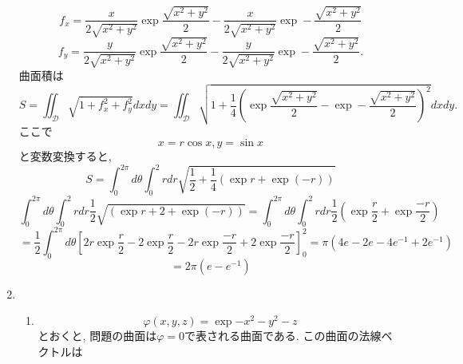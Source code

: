 \documentclass[a4paper,10pt,report]{amsart}
\theoremstyle{plain}
\theoremstyle{definition}
\theoremstyle{remark}
\begin{document}
\begin{enumerate}
\begin{equation*}
            f_{x}=\frac{x}{2\sqrt{x^{2}+y^{2}}}\exp{\frac{\sqrt{x^{2}+y^{2}}}{2}}-\frac{x}{2\sqrt{x^{2}+y^{2}}}\exp-{\frac{\sqrt{x^{2}+y^{2}}}{2}}
        \end{equation*}
        \begin{equation*}
            f_{y}=\frac{y}{2\sqrt{x^{2}+y^{2}}}\exp{\frac{\sqrt{x^{2}+y^{2}}}{2}}-\frac{y}{2\sqrt{x^{2}+y^{2}}}\exp-{\frac{\sqrt{x^{2}+y^{2}}}{2}}.
        \end{equation*}
        曲面積は
        \begin{equation*}
            S=\iint_{\mathcal{D}}\sqrt{1+f_{x}^{2}+f_{y}^{2}}dxdy=\iint_{\mathcal{D}}\sqrt{1+\frac{1}{4}{\left(\exp{\frac{\sqrt{x^{2}+y^{2}}}{2}}-\exp-{\frac{\sqrt{x^{2}+y^{2}}}{2}}\right)}^{2}}dxdy.
        \end{equation*}
        ここで
        \begin{equation*}
            x=r\cos{x},y=\sin{x}
        \end{equation*}
        と変数変換すると, 
        \begin{equation*}
            S=\int_{0}^{2\pi}d\theta\int_{0}^{2}rdr\sqrt{\frac{1}{2}+\frac{1}{4}\left(\exp{r}+\exp{(-r)}\right)}
        \end{equation*}
        \begin{equation*}
            \int_{0}^{2\pi}d\theta\int_{0}^{2}rdr\frac{1}{2}\sqrt{\left(\exp{r}+2+\exp{(-r)}\right)}=\int_{0}^{2\pi}d\theta\int_{0}^{2}rdr\frac{1}{2}\left(\exp{\frac{r}{2}}+\exp{\frac{-r}{2}}\right)
        \end{equation*}
        \begin{equation*}
            =\frac{1}{2}\int_{0}^{2\pi}d\theta{\left[2r\exp{\frac{r}{2}}-2\exp{\frac{r}{2}}-2r\exp{\frac{-r}{2}}+2\exp{\frac{-r}{2}}\right]}_{0}^{2}=\pi(4e-2e-4e^{-1}+2e^{-1})
        \end{equation*}
        \begin{equation*}
            =2\pi(e-e^{-1})
        \end{equation*}
        \item 
        \begin{enumerate}
            \item 
            \begin{equation*}
                \varphi(x,y,z)=\exp{-x^{2}-y^{2}}-z
            \end{equation*}
            とおくと, 問題の曲面は\(\varphi=0\)で表される曲面である. この曲面の法線ベクトルは
            \begin{equation*}

\end{equation*}
\end{enumerate}
\end{enumerate}
\end{document}
